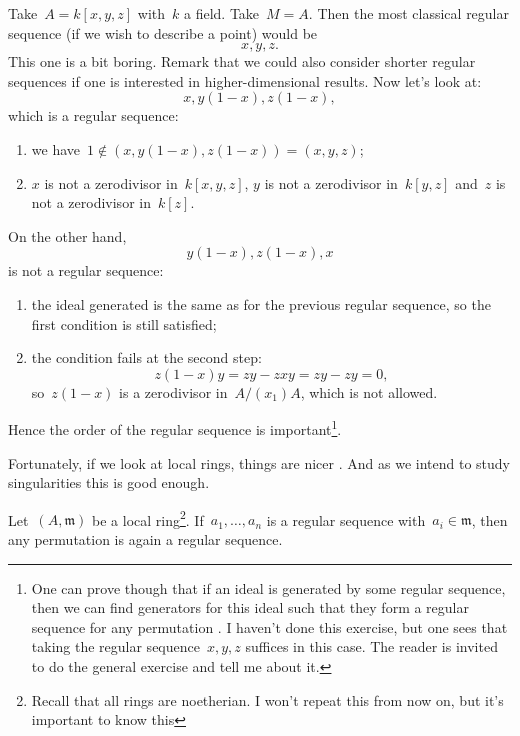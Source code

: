 \documentclass[10pt,a4paper]{article}
\begin{document}
\begin{example}
  Take~$A=k[x,y,z]$ with~$k$ a field. Take~$M=A$. Then the most classical regular sequence (if we wish to describe a point) would be
  \begin{equation}
    x,y,z.
  \end{equation}
  This one is a bit boring. Remark that we could also consider shorter regular sequences if one is interested in higher-dimensional results. Now let's look at:
  \begin{equation}
    x,y(1-x),z(1-x),
  \end{equation}
  which is a regular sequence:
  \begin{enumerate}
    \item we have~$1\notin(x,y(1-x),z(1-x))=(x,y,z)$;
    \item $x$ is not a zerodivisor in~$k[x,y,z]$, $y$ is not a zerodivisor in~$k[y,z]$ and~$z$ is not a zerodivisor in~$k[z]$.
  \end{enumerate}
  On the other hand,
  \begin{equation}
    y(1-x),z(1-x),x
  \end{equation}
  is not a regular sequence:
  \begin{enumerate}
    \item the ideal generated is the same as for the previous regular sequence, so the first condition is still satisfied;
    \item the condition fails at the second step:
      \begin{equation}
        z(1-x)y=zy-zxy=zy-zy=0,
      \end{equation}
      so~$z(1-x)$ is a zerodivisor in~$A/(x_1)A$, which is not allowed.
  \end{enumerate}
  Hence the order of the regular sequence is important\footnote{One can prove though that if an ideal is generated by some regular sequence, then we can find generators for this ideal such that they form a regular sequence for any permutation \cite[exercise 17.6]{eisenbud-commutative-algebra}. I haven't done this exercise, but one sees that taking the regular sequence~$x,y,z$ suffices in this case. The reader is invited to do the general exercise and tell me about it.}.
\end{example}
Fortunately, if we look at local rings, things are nicer \cite[corollary 17.2]{eisenbud-commutative-algebra}. And as we intend to study singularities this is good enough.
\begin{lemma}
  Let~$(A,\mathfrak{m})$ be a local ring\footnote{Recall that all rings are noetherian. I won't repeat this from now on, but it's important to know this}. If~$a_1,\dotsc,a_n$ is a regular sequence with~$a_i\in\mathfrak{m}$, then any permutation is again a regular sequence.
\end{lemma}
\end{document}
